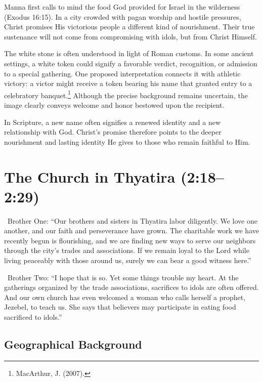 Manna first calls to mind the food God provided for Israel in the wilderness (Exodus 16:15). In a city crowded with pagan worship and hostile pressures, Christ promises His victorious people a different kind of nourishment. Their true sustenance will not come from compromising with idols, but from Christ Himself.

The white stone is often understood in light of Roman customs. In some ancient settings, a white token could signify a favorable verdict, recognition, or admission to a special gathering. One proposed interpretation connects it with athletic victory: a victor might receive a token bearing his name that granted entry to a celebratory banquet.\footnote{MacArthur, J. (2007).} Although the precise background remains uncertain, the image clearly conveys welcome and honor bestowed upon the recipient.

In Scripture, a new name often signifies a renewed identity and a new relationship with God. Christ's promise therefore points to the deeper nourishment and lasting identity He gives to those who remain faithful to Him.

\section{The Church in Thyatira (2:18--2:29)}

\begin{DialogueBox}
\noindent\faUser\ Brother One: ``Our brothers and sisters in Thyatira labor diligently. We love one another, and our faith and perseverance have grown. The charitable work we have recently begun is flourishing, and we are finding new ways to serve our neighbors through the city's trades and associations. If we remain loyal to the Lord while living peaceably with those around us, surely we can bear a good witness here.''

\vspace{0.1cm}

\noindent\faUser\ Brother Two: ``I hope that is so. Yet some things trouble my heart. At the gatherings organized by the trade associations, sacrifices to idols are often offered. And our own church has even welcomed a woman who calls herself a prophet, Jezebel, to teach us. She says that believers may participate in eating food sacrificed to idols.''
\end{DialogueBox}

\subsection{Geographical Background}

